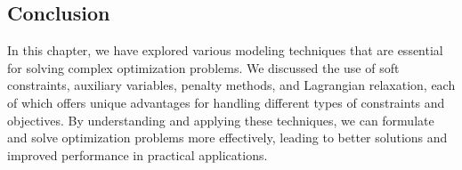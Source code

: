 \subsection{Conclusion}

In this chapter, we have explored various modeling techniques that are essential for solving complex optimization problems.
We discussed the use of soft constraints, auxiliary variables, penalty methods, and Lagrangian relaxation, each of which offers unique advantages for
handling different types of constraints and objectives.
By understanding and applying these techniques, we can formulate and solve optimization problems more effectively, leading to better solutions and
improved performance in practical applications.
